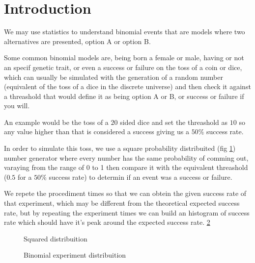 \section{Introduction}

We may use statistics to understand binomial events that are models where
two alternatives are presented, option A or option B.

Some common binomial models are, being born a female or male, having or not an specif genetic trait,
or even a success or failure on the toss of a coin or dice, which can usually
be simulated with the generation of a random number (equivalent of the toss of a dice in the discrete universe)
and then check it against a threashold that would define it as being
option A or B, or success or failure if you will.

An example would be the toss of a $20$ sided dice and set the threashold as $10$ so any value higher
than that is considered a success giving us a $50\%$ success rate.

In order to simulate this toss, we use a square probability distribuited (fig \ref{intro:squared}) number generator
where every number has the same probability of comming out, varaying from the range of 0 to 1
then compare it with the equivalent threashold ($0.5$ for a $50\%$ success rate) to determin if an event was
a success or failure.

We repete the procediment \introexperimentsize{} times so that we can obtein the given success rate of that experiment,
which may be different from the theoretical expected success rate, but by repeating the experiment
\introexperimentrepeats{} times we can build an histogram of success rate which should have it's peak around the
expected success rate.
\ref{intro:binomial}

\begin{center}
\begin{figure}[H]
\begin{center}
\caption{Squared distribuition}
\label{intro:squared}
\end{center}
\end{figure}
\end{center}

\begin{center}
\begin{figure}[H]
\begin{center}
\caption{Binomial experiment distribuition}
\label{intro:binomial}
\end{center}
\end{figure}
\end{center}
